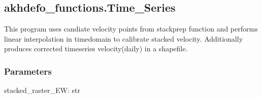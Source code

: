 \documentclass[letterpaper,10pt]{sphinxmanual}
\begin{document}
\sphinxstepscope


\subsection{akhdefo\_functions.Time\_Series}
\label{\detokenize{generated/akhdefo_functions.Time_Series:akhdefo-functions-time-series}}\label{\detokenize{generated/akhdefo_functions.Time_Series::doc}}

\begin{fulllineitems}
\label{\detokenize{generated/akhdefo_functions.Time_Series:akhdefo_functions.Time_Series}}
\pysigstartsignatures
{}
\pysigstopsignatures
\sphinxAtStartPar
This program uses candiate velocity points from stackprep function and performs linear interpolation in time\sphinxhyphen{}domain to calibrate
stacked velocity. Additionally produces corrected timeseries velocity(daily) in a shapefile.


\subsubsection{Parameters}
\label{\detokenize{generated/akhdefo_functions.Time_Series:parameters}}
\sphinxAtStartPar
stacked\_raster\_EW: str


\end{fulllineitems}
\end{document}

